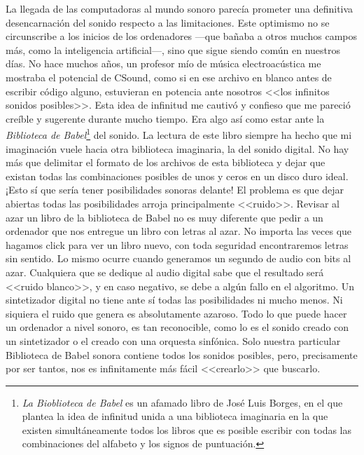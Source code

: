 La llegada de las computadoras al mundo sonoro parecía prometer una definitiva desencarnación del sonido respecto a las limitaciones. Este optimismo no se circunscribe a los inicios de los ordenadores ---que bañaba a otros muchos campos más, como la inteligencia artificial---, sino que sigue siendo común en nuestros días. No hace muchos años, un profesor mío de música electroacústica me mostraba el potencial de CSound, como si en ese archivo en blanco antes de escribir código alguno, estuvieran en potencia ante nosotros <<los infinitos sonidos posibles>>. Esta idea de infinitud me cautivó y confieso que me pareció creíble y sugerente durante mucho tiempo. Era algo así como estar ante la \textit{Biblioteca de Babel}\footnote{\textit{La Bioblioteca de Babel} es un afamado libro de José Luis Borges, en el que plantea la idea de infinitud unida a una biblioteca imaginaria en la que existen simultáneamente todos los libros que es posible escribir con todas las combinaciones del alfabeto y los signos de puntuación.} del sonido. La lectura de este libro siempre ha hecho que mi imaginación vuele hacia otra biblioteca imaginaria, la del sonido digital. No hay más que delimitar el formato de los archivos de esta biblioteca y dejar que existan todas las combinaciones posibles de unos y ceros en un disco duro ideal. ¡Esto sí que sería tener posibilidades sonoras delante! El problema es que dejar abiertas todas las posibilidades arroja principalmente <<ruido>>. Revisar al azar un libro de la biblioteca de Babel no es muy diferente que pedir a un ordenador que nos entregue un libro con letras al azar. No importa las veces que hagamos click para ver un libro nuevo, con toda seguridad encontraremos letras sin sentido. Lo mismo ocurre cuando generamos un segundo de audio con bits al azar. Cualquiera que se dedique al audio digital sabe que el resultado será <<ruido blanco>>, y en caso negativo, se debe a algún fallo en el algoritmo. Un sintetizador digital no tiene ante sí todas las posibilidades ni mucho menos. Ni siquiera el ruido que genera es absolutamente azaroso. Todo lo que puede hacer un ordenador a nivel sonoro, es tan reconocible, como lo es el sonido creado con un sintetizador o el creado con una orquesta sinfónica. Solo nuestra particular Biblioteca de Babel sonora contiene todos los sonidos posibles, pero, precisamente por ser tantos, nos es infinitamente más fácil <<crearlo>> que buscarlo.

